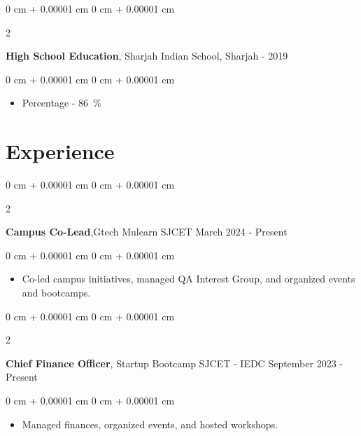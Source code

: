 \documentclass[10pt, letterpaper]{article}
\newenvironment{highlights}{
    \begin{itemize}[
        topsep=0.10 cm,
        parsep=0.10 cm,
        partopsep=0pt,
        itemsep=0pt,
        leftmargin=0 cm + 10pt
    ]
}{
    \end{itemize}
} %
\newenvironment{onecolentry}{
    \begin{adjustwidth}{
        0 cm + 0.00001 cm
    }{
        0 cm + 0.00001 cm
    }
}{
    \end{adjustwidth}
} %
\newenvironment{twocolentry}[2][]{
    \onecolentry
    \def\secondColumn{#2}
    \setcolumnwidth{\fill, 4.5 cm}
    \begin{paracol}{2}
}{
    \switchcolumn \raggedleft \secondColumn
    \end{paracol}
    \endonecolentry
} %
\begin{document}
        \begin{twocolentry}{
            2014 - 2019
        }
            \textbf{High School Education}, Sharjah Indian School, Sharjah\end{twocolentry}

        \vspace{0.10 cm}
        \begin{onecolentry}
            \begin{highlights}
                \item Percentage - \qty{86}{\percent} 
            \end{highlights}
        \end{onecolentry}

    \section{Experience}
        \begin{twocolentry}{
            March 2024 - Present
        }
            \textbf{Campus  Co-Lead},Gtech Mulearn SJCET\end{twocolentry}

        \vspace{0.10 cm}
        \begin{onecolentry}
            \begin{highlights}
                \item Co-led campus initiatives, managed QA Interest Group, and organized events and bootcamps.
            \end{highlights}
        \end{onecolentry}


        \vspace{0.2 cm}

        \begin{twocolentry}{
            September 2023 - Present
        }
            \textbf{Chief Finance Officer}, Startup Bootcamp SJCET - IEDC\end{twocolentry}

        \vspace{0.10 cm}
        \begin{onecolentry}
            \begin{highlights}
                \item Managed finances, organized events, and hosted workshops.
            \end{highlights}
        \end{onecolentry}
\end{document}
